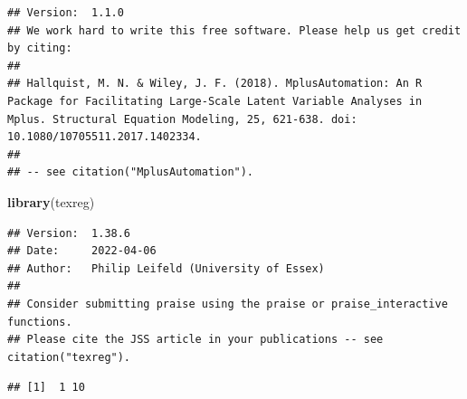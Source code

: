 \documentclass[
]{book}
\newenvironment{Shaded}{\begin{snugshade}}{\end{snugshade}}
\newcommand{\AttributeTok}[1]{\textcolor[rgb]{0.13,0.29,0.53}{#1}}
\newcommand{\CommentTok}[1]{\textcolor[rgb]{0.56,0.35,0.01}{\textit{#1}}}
\newcommand{\ConstantTok}[1]{\textcolor[rgb]{0.56,0.35,0.01}{#1}}
\newcommand{\DecValTok}[1]{\textcolor[rgb]{0.00,0.00,0.81}{#1}}
\newcommand{\FunctionTok}[1]{\textcolor[rgb]{0.13,0.29,0.53}{\textbf{#1}}}
\newcommand{\NormalTok}[1]{#1}
\newcommand{\OtherTok}[1]{\textcolor[rgb]{0.56,0.35,0.01}{#1}}
\newcommand{\SpecialCharTok}[1]{\textcolor[rgb]{0.81,0.36,0.00}{\textbf{#1}}}
\newcommand{\StringTok}[1]{\textcolor[rgb]{0.31,0.60,0.02}{#1}}
\begin{document}
\begin{verbatim}
## Version:  1.1.0
## We work hard to write this free software. Please help us get credit by citing: 
## 
## Hallquist, M. N. & Wiley, J. F. (2018). MplusAutomation: An R Package for Facilitating Large-Scale Latent Variable Analyses in Mplus. Structural Equation Modeling, 25, 621-638. doi: 10.1080/10705511.2017.1402334.
## 
## -- see citation("MplusAutomation").
\end{verbatim}

\begin{Shaded}
\begin{Highlighting}[]
\FunctionTok{library}\NormalTok{(texreg)}
\end{Highlighting}
\end{Shaded}

\begin{verbatim}
## Version:  1.38.6
## Date:     2022-04-06
## Author:   Philip Leifeld (University of Essex)
## 
## Consider submitting praise using the praise or praise_interactive functions.
## Please cite the JSS article in your publications -- see citation("texreg").
\end{verbatim}

\begin{Shaded}
\end{Shaded}

\begin{verbatim}
## [1]  1 10
\end{verbatim}
\end{document}

